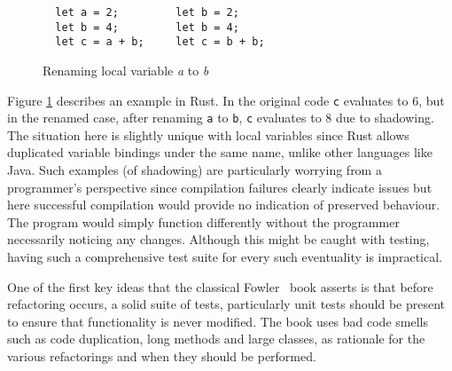 \begin{figure}[h]
\begin{verbatim}
  let a = 2;         let b = 2;
  let b = 4;         let b = 4;
  let c = a + b;     let c = b + b;
\end{verbatim}
\caption{Renaming local variable \emph{a} to \emph{b}}
\label{Fig:opdyke}
\end{figure}

Figure \ref{Fig:opdyke} describes an example in Rust. In the original code {\verb|c|} evaluates to 6, but in the renamed case, after renaming {\verb|a|} to {\verb|b|}, {\verb|c|} evaluates to 8 due to shadowing. The situation here is slightly unique with local variables since Rust allows duplicated variable bindings under the same name, unlike other languages like Java. Such examples (of shadowing) are particularly worrying from a programmer's perspective since compilation failures clearly indicate issues but here successful compilation would provide no indication of preserved behaviour. The program would simply function differently without the programmer necessarily noticing any changes. Although this might be caught with testing, having such a comprehensive test suite for every such eventuality is impractical.

One of the first key ideas that the classical Fowler~\cite{fowler99} book asserts is that before refactoring occurs, a solid suite of tests, particularly unit tests should be present to ensure that functionality is never modified. The book uses bad code smells such as code duplication, long methods and large classes, as rationale for the various refactorings and when they should be performed. 



